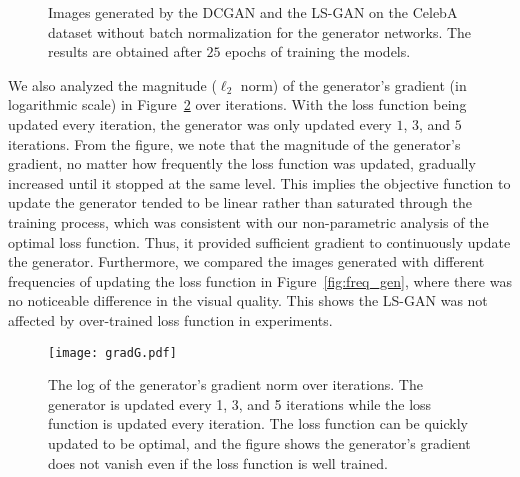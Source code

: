 \documentclass[11pt,fullpage, letterpaper,twoside]{article}
\newcommand{\1}[1]{\mathds{1}_{\left[#1\right]}}
\begin{document}
\begin{figure}[t]
\centering
{}
\caption{Images generated by the DCGAN and the LS-GAN on the CelebA dataset without batch normalization for the generator networks. The results are obtained after $25$ epochs of training the models.}\label{fig:celebA_noBN}
\end{figure}





We also analyzed the magnitude ($\ell_2$ norm) of the generator's gradient (in logarithmic scale) in Figure~\ref{fig:gradG} over iterations. With the loss function being updated every iteration, the generator was only updated every $1$, $3$, and $5$ iterations.
From the figure, we note that the magnitude of the generator's gradient, no matter how frequently the loss function was updated, gradually increased until it stopped at the same level. This implies the objective function to update the generator tended to be linear rather than saturated through the training process, which was consistent with our non-parametric analysis of the optimal loss function. Thus, it provided sufficient gradient to continuously update the generator. Furthermore, we compared the images generated with different frequencies of updating the loss function in Figure~\ref{fig:freq_gen}, where there was no noticeable difference in the visual quality.  This shows the LS-GAN was not affected by over-trained loss function in experiments.

\begin{figure}[t!]
    \centering
        \texttt{[image: gradG.pdf]}
        \caption{The log of the generator's gradient norm over iterations. The generator is updated every 1, 3, and 5 iterations while the loss function is updated every iteration.  The loss function can be quickly updated to be optimal, and the figure shows the generator's gradient does not vanish even if the loss function is well trained.}\label{fig:gradG}
\end{figure}
\end{document}
